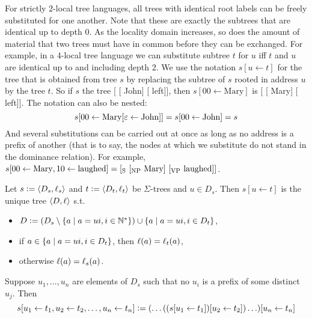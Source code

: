 For strictly $2$-local tree languages, all trees with identical root labels can be freely substituted for one another.
Note that these are exactly the subtrees that are identical up to depth $0$.
As the locality domain increases, so does the amount of material that two trees must have in common before they can be exchanged.
For example, in a $4$-local tree language we can substitute subtree $t$ for $u$ iff $t$ and $u$ are identical up to and including depth $2$.
We use the notation $s[u \leftarrow t]$ for the tree that is obtained from tree $s$ by replacing the subtree of $s$ rooted in address $u$ by the tree $t$.
So if $s$ the tree [ [ John] [ left]], then $s[00 \leftarrow \text{Mary}]$ is [ [ Mary] [ left]].
The notation can also be nested:
%
\[
    s[00 \leftarrow \text{Mary}[\varepsilon \leftarrow \text{John}]]
    =
    s[00 \leftarrow \text{John}]
    =
    s
\]
%
And several substitutions can be carried out at once as long as no address is a prefix of another (that is to say, the nodes at which we substitute do not stand in the dominance relation).
For example, $s[00 \leftarrow \text{Mary}, 10 \leftarrow \text{laughed}] = \text{[\ensuremath{_{\textrm{S}}} [\ensuremath{_{\textrm{NP}}} Mary] [\ensuremath{_{\textrm{VP}}} laughed]]}$.
%
\begin{definition}
    Let $s \mathrel{\mathop:}= \left \langle D_s,\ell_s \right \rangle $ and $t \mathrel{\mathop:}= \left \langle D_t, \ell_t \right \rangle $ be $\Sigma$-trees and $u \in D_s$.
    Then $s[u \leftarrow t]$ is the unique tree $\left \langle D,\ell \right \rangle $ s.t.\
    \begin{itemize}
        \item $D \mathrel{\mathop:}= (D_s \setminus \left \{  a \mid a = ui, i \in \mathbb{N}^*  \right \}) \cup \left \{  a \mid a = ui, i \in D_t \right \}$,
        \item if $a \in \left \{  a \mid a = ui, i \in D_t \right \}$, then $\ell(a) = \ell_t(a)$,
        \item otherwise $\ell(a) = \ell_s(a)$.
    \end{itemize}
    Suppose $u_1, \ldots, u_n$ are elements of $D_s$ such that no $u_i$ is a prefix of some distinct $u_j$.
    Then
    \[
        s[u_1 \leftarrow t_1, u_2 \leftarrow t_2, \ldots, u_n \leftarrow t_n]
        \mathrel{\mathop:}=
        ( \ldots ((s[u_1 \leftarrow t_1])[u_2 \leftarrow t_2]) \ldots )[u_n \leftarrow t_n]
    \]
\end{definition}
%

